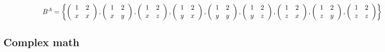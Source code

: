 \begin{example}
    \[
    B^A = \left\{
    \left( \begin{array}{c c}
    1 & 2 \\
    x & x \\
    \end{array} \right),
    \left( \begin{array}{c c}
    1 & 2 \\
    x & y \\
    \end{array} \right),
    \left( \begin{array}{c c}
    1 & 2 \\
    x & z \\
    \end{array} \right),
    \left( \begin{array}{c c}
    1 & 2 \\
    y & x \\
    \end{array} \right),
    \left( \begin{array}{c c}
    1 & 2 \\
    y & y \\
    \end{array} \right),
    \left( \begin{array}{c c}
    1 & 2 \\
    y & z \\
    \end{array} \right),
    \left( \begin{array}{c c}
    1 & 2 \\
    z & x \\
    \end{array} \right),
    \left( \begin{array}{c c}
    1 & 2 \\
    z & y \\
    \end{array} \right),
    \left( \begin{array}{c c}
    1 & 2 \\
    z & z \\
    \end{array} \right)
    \right\}
    \]
\end{example}

\subsection{Complex math}
